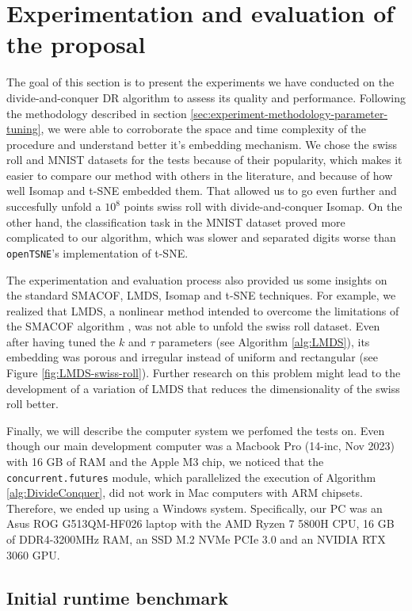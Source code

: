 \section{Experimentation and evaluation of the proposal}
\label{sec:experimentation-and-evaluation}

The goal of this section is to present the experiments we have conducted on the divide-and-conquer DR algorithm to assess its quality and performance. Following the methodology described in section \ref{sec:experiment-methodology-parameter-tuning}, we were able to corroborate the space and time complexity of the procedure and understand better it's embedding mechanism. We chose the swiss roll and MNIST datasets for the tests because of their popularity, which makes it easier to compare our method with others in the literature, and because of how well Isomap and t-SNE embedded them. That allowed us to go even further and succesfully unfold a $10^8$ points swiss roll with divide-and-conquer Isomap. On the other hand, the classification task in the MNIST dataset proved more complicated to our algorithm, which was slower and separated digits worse than \verb|openTSNE|'s implementation of t-SNE.

The experimentation and evaluation process also provided us some insights on the standard SMACOF, LMDS, Isomap and t-SNE techniques. For example, we realized that LMDS, a nonlinear method intended to overcome the limitations of the SMACOF algorithm \citep{Chen2009}, was not able to unfold the swiss roll dataset. Even after having tuned the $k$ and $\tau$ parameters (see Algorithm \ref{alg:LMDS}), its embedding was porous and irregular instead of uniform and rectangular (see Figure \ref{fig:LMDS-swiss-roll}). Further research on this problem might lead to the development of a variation of LMDS that reduces the dimensionality of the swiss roll better.

Finally, we will describe the computer system we perfomed the tests on. Even though our main development computer was a  Macbook Pro (14-inc, Nov 2023) with 16 GB of RAM and the Apple M3 chip, we noticed that the \verb|concurrent.futures| module, which parallelized the execution of Algorithm \ref{alg:DivideConquer}, did not work in Mac computers with ARM chipsets. Therefore, we ended up using a Windows system. Specifically, our PC was an Asus ROG G513QM-HF026 laptop with the AMD Ryzen 7 5800H CPU, 16 GB of DDR4-3200MHz RAM, an SSD M.2 NVMe PCIe 3.0 and an NVIDIA RTX 3060 GPU.

\subsection{Initial runtime benchmark}

